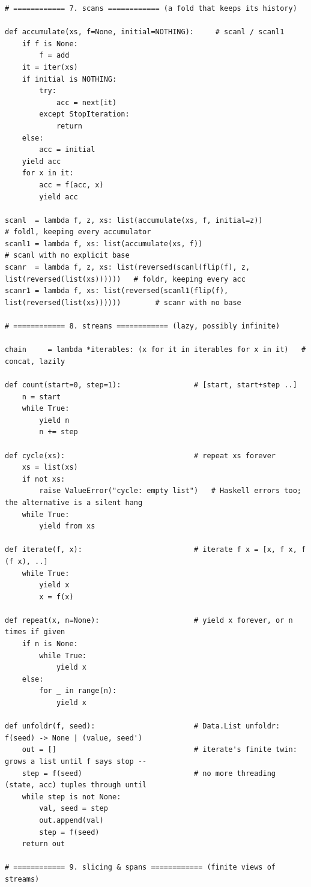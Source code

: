 \documentclass[11pt,letterpaper]{book}
\begin{document}
\begin{lstlisting}[style=file]
# ============ 7. scans ============ (a fold that keeps its history)

def accumulate(xs, f=None, initial=NOTHING):     # scanl / scanl1
    if f is None:
        f = add
    it = iter(xs)
    if initial is NOTHING:
        try:
            acc = next(it)
        except StopIteration:
            return
    else:
        acc = initial
    yield acc
    for x in it:
        acc = f(acc, x)
        yield acc

scanl  = lambda f, z, xs: list(accumulate(xs, f, initial=z))            # foldl, keeping every accumulator
scanl1 = lambda f, xs: list(accumulate(xs, f))                          # scanl with no explicit base
scanr  = lambda f, z, xs: list(reversed(scanl(flip(f), z, list(reversed(list(xs))))))   # foldr, keeping every acc
scanr1 = lambda f, xs: list(reversed(scanl1(flip(f), list(reversed(list(xs))))))        # scanr with no base

# ============ 8. streams ============ (lazy, possibly infinite)

chain     = lambda *iterables: (x for it in iterables for x in it)   # concat, lazily

def count(start=0, step=1):                 # [start, start+step ..]
    n = start
    while True:
        yield n
        n += step

def cycle(xs):                              # repeat xs forever
    xs = list(xs)
    if not xs:
        raise ValueError("cycle: empty list")   # Haskell errors too; the alternative is a silent hang
    while True:
        yield from xs

def iterate(f, x):                          # iterate f x = [x, f x, f (f x), ..]
    while True:
        yield x
        x = f(x)

def repeat(x, n=None):                      # yield x forever, or n times if given
    if n is None:
        while True:
            yield x
    else:
        for _ in range(n):
            yield x

def unfoldr(f, seed):                       # Data.List unfoldr: f(seed) -> None | (value, seed')
    out = []                                # iterate's finite twin: grows a list until f says stop --
    step = f(seed)                          # no more threading (state, acc) tuples through until
    while step is not None:
        val, seed = step
        out.append(val)
        step = f(seed)
    return out

# ============ 9. slicing & spans ============ (finite views of streams)


\end{lstlisting}
\end{document}
